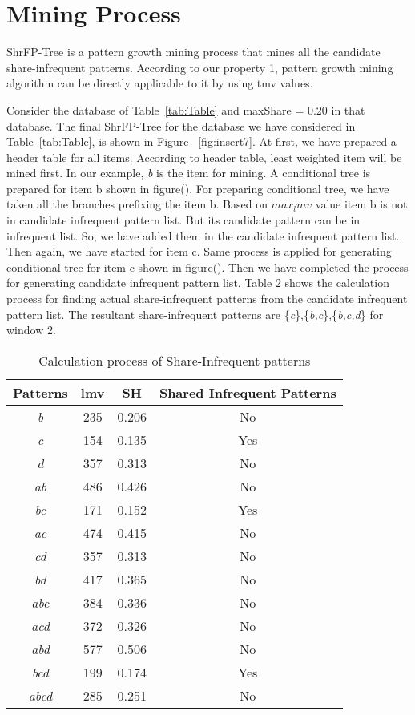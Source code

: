 \section{Mining Process}
ShrFP-Tree is a pattern growth mining process that mines all the candidate share-infrequent patterns. According to our property 1, pattern growth mining algorithm can be directly applicable to it by using tmv values.
\par Consider the database of Table~\ref{tab:Table} and maxShare = 0.20 in that database. The final ShrFP-Tree for the database we have considered in Table~\ref{tab:Table}, is shown in Figure ~\ref{fig:insert7}. At first, we have prepared a header table for all items. According to header table, least weighted item will be mined first. In our example, {\it b} is the item for mining. A conditional tree is prepared for item b shown in figure(). For preparing conditional tree, we have taken all the branches prefixing the item b. Based on $max_lmv$ value item b is not in candidate infrequent pattern list. But its candidate pattern can be in infrequent list. So, we have added them in the candidate infrequent pattern list. Then again, we have started for item c. Same process is applied for generating conditional tree for item c shown in figure(). Then we have completed the process for generating candidate infrequent pattern list. Table 2 shows the calculation process for finding actual share-infrequent patterns from the candidate infrequent pattern list. The resultant share-infrequent patterns are \{{\it c}\},\{{\it b,c}\},\{{\it b,c,d}\} for window 2.
\begin{table}
\begin{center}
\begin{tabular}{ |c|c|c|c| } 
\hline
Patterns & lmv & SH & Shared Infrequent Patterns \\
\hline
{\it b} & 235 & 0.206 & No\\
{\it c} & 154 & 0.135 & Yes\\
{\it d} & 357 & 0.313 & No\\
{\it ab} & 486 & 0.426 & No\\
{\it bc} & 171 & 0.152 & Yes\\
{\it ac} & 474 & 0.415 & No\\
{\it cd} & 357 & 0.313 & No\\
{\it bd} & 417 & 0.365 & No\\
{\it abc} & 384 & 0.336 & No\\
{\it acd} & 372 & 0.326 & No\\
{\it abd} & 577 & 0.506 & No\\
{\it bcd} & 199 & 0.174 & Yes\\
{\it abcd} & 285 & 0.251 & No\\


\hline
\end{tabular}
\caption{Calculation process of Share-Infrequent patterns}
\label{tab:Table2}
\end{center}
\end{table}


